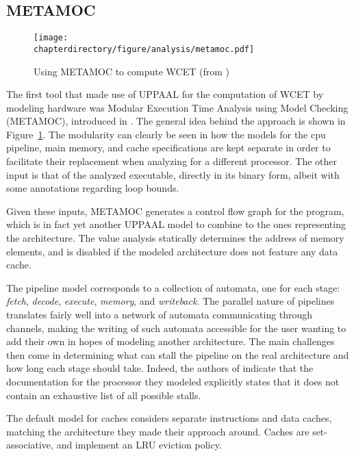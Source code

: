 \stopallthesefloats
\subsection{METAMOC}
\begin{figure}[hbt]
\begin{center}
\texttt{[image: \\chapterdirectory/figure/analysis/metamoc.pdf]}
\end{center}
\caption{Using METAMOC to compute WCET (from
\cite{dalsgaard_et_al:OASIcs:2010:2831})}%
\label{fig:formal_analysis:metamoc}
\end{figure}

The first tool that made use of UPPAAL for the computation of WCET by modeling
hardware was Modular Execution Time Analysis using Model Checking (METAMOC),
introduced in \cite{dalsgaard_et_al:OASIcs:2010:2831}. The general idea behind
the approach is shown in Figure~\ref{fig:formal_analysis:metamoc}. The
modularity can clearly be seen in how the models for the cpu pipeline,
main memory, and cache specifications are kept separate in order to facilitate
their replacement when analyzing for a different processor. The other input is
that of the analyzed executable, directly in its binary form, albeit with some
annotations regarding loop bounds.

Given these inputs, METAMOC generates a control flow graph for the program,
which is in fact yet another UPPAAL model to combine to the ones representing
the architecture. The value analysis statically determines the address of
memory elements, and is disabled if the modeled architecture does not feature
any data cache.

The pipeline model corresponds to a collection of automata, one for each stage:
\textit{fetch}, \textit{decode}, \textit{execute}, \textit{memory}, and
\textit{writeback}. The parallel nature of pipelines translates fairly well
into a network of automata communicating through channels, making the writing
of such automata accessible for the user wanting to add their own in hopes of
modeling another architecture. The main challenges then come in determining
what can stall the pipeline on the real architecture and how long each stage
should take. Indeed, the authors of \cite{dalsgaard_et_al:OASIcs:2010:2831}
indicate that the documentation for the processor they modeled explicitly
states that it does not contain an exhaustive list of all possible stalls.

The default model for caches considers separate instructions and data caches,
matching the architecture they made their approach around. Caches are
set-associative, and implement an LRU eviction policy.


